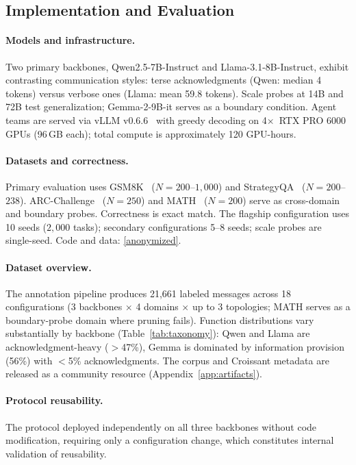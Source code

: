 \subsection{Implementation and Evaluation}
\label{sec:implementation}

\paragraph{Models and infrastructure.}
Two primary backbones, Qwen2.5-7B-Instruct and Llama-3.1-8B-Instruct, exhibit contrasting communication styles: terse acknowledgments (Qwen: median 4 tokens) versus verbose ones (Llama: mean 59.8 tokens).
Scale probes at 14B and 72B test generalization; Gemma-2-9B-it serves as a boundary condition.
Agent teams are served via vLLM v0.6.6~\citep{kwon_vllm_2023} with greedy decoding on 4$\times$~RTX PRO 6000 GPUs (96\,GB each); total compute is approximately 120 GPU-hours.

\paragraph{Datasets and correctness.}
Primary evaluation uses GSM8K~\citep{cobbe_gsm8k_2021} ($N{=}200$--$1{,}000$) and StrategyQA~\citep{geva_strategyqa_2021} ($N{=}200$--$238$).
ARC-Challenge~\citep{clark_arc_2018} ($N{=}250$) and MATH~\citep{hendrycks_math_2021} ($N{=}200$) serve as cross-domain and boundary probes.
Correctness is exact match. The flagship configuration uses 10 seeds ($2{,}000$ tasks); secondary configurations 5--8 seeds; scale probes are single-seed. Code and data: \url{[anonymized]}.

\paragraph{Dataset overview.}
The annotation pipeline produces 21{,}661 labeled messages across 18 configurations (3 backbones $\times$ 4 domains $\times$ up to 3 topologies; MATH serves as a boundary-probe domain where pruning fails). Function distributions vary substantially by backbone (Table~\ref{tab:taxonomy}): Qwen and Llama are acknowledgment-heavy ($>$47\%), Gemma is dominated by information provision (56\%) with $<$5\% acknowledgments. The corpus and Croissant metadata are released as a community resource (Appendix~\ref{app:artifacts}).

\paragraph{Protocol reusability.}
The protocol deployed independently on all three backbones without code modification, requiring only a configuration change, which constitutes internal validation of reusability.
